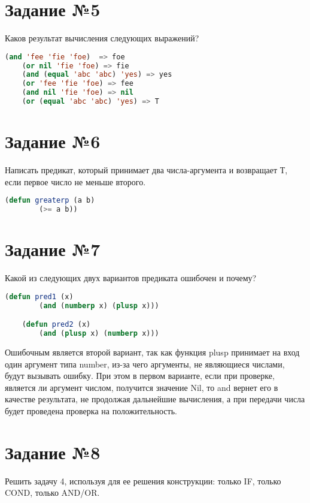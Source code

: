 \section{Задание №5}

Каков результат вычисления следующих выражений?

\begin{lstlisting}[language=Lisp]
	(and 'fee 'fie 'foe)  => foe
	(or nil 'fie 'foe) => fie
	(and (equal 'abc 'abc) 'yes) => yes
	(or 'fee 'fie 'foe) => fee
	(and nil 'fie 'foe) => nil
	(or (equal 'abc 'abc) 'yes) => T
\end{lstlisting}

\section{Задание №6}

Написать предикат, который принимает два числа-аргумента и возвращает
Т, если первое число не меньше второго.

\begin{lstlisting}[language=Lisp]
	(defun greaterp (a b)
		(>= a b))
\end{lstlisting}

\section{Задание №7}

Какой из следующих двух вариантов предиката ошибочен и почему?

\begin{lstlisting}[language=Lisp]
	(defun pred1 (x)
		(and (numberp x) (plusp x)))

	(defun pred2 (x)
		(and (plusp x) (numberp x)))
\end{lstlisting}

Ошибочным является второй вариант, так как функция plusp принимает на
вход один аргумент типа number, из-за чего аргументы, не являющиеся числами,
будут вызывать ошибку. При этом в первом варианте, если при проверке,
является ли аргумент числом, получится значение Nil, то and вернет его в
качестве результата, не продолжая дальнейшие вычисления, а при передачи
числа будет проведена проверка на положительность.

\section{Задание №8}

Решить задачу 4, используя для ее решения конструкции:
только IF, только COND, только AND/OR.

